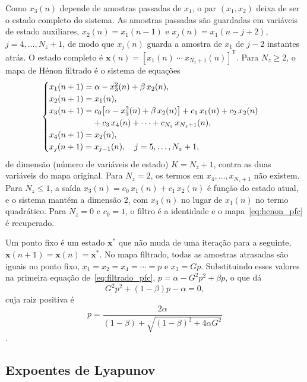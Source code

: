 \documentclass{pfccefsa}
\begin{document}
Como $x_3(n)$ depende de amostras passadas de $x_1$, o par $(x_1,x_2)$ deixa de
ser o estado completo do sistema. As amostras passadas são guardadas em
variáveis de estado auxiliares, $x_2(n)=x_1(n-1)$ e
$x_j(n)=x_1(n-j+2)$, $j=4,\ldots,N_z+1$, de modo que $x_j(n)$ guarda a
amostra de $x_1$ de $j-2$ instantes atrás. O estado completo é
$\mathbf{x}(n)=[x_1(n)\ \cdots\ x_{N_z+1}(n)]^{\mathsf T}$. Para $N_z\ge2$, o mapa de Hénon filtrado
é o sistema de equações \cite{Borges2022sbrt,BorgesCNSNS2024}
\begin{equation}
  \begin{cases}
    x_1(n+1) = \alpha - x_3^2(n) + \beta\,x_2(n),\\
    x_2(n+1) = x_1(n),\\
    x_3(n+1) = c_0\bigl[\alpha - x_3^2(n) + \beta\,x_2(n)\bigr]
      + c_1\,x_1(n) + c_2\,x_2(n)\\
    \hphantom{x_3(n+1) =} + c_3\,x_4(n) + \cdots + c_{N_z}\,x_{N_z+1}(n),\\
    x_4(n+1) = x_2(n),\\
    x_j(n+1) = x_{j-1}(n), \quad j=5,\ldots,N_z+1,
  \end{cases}
  \label{eq:filtrado_pfc}
\end{equation}
de dimensão (número de variáveis de estado) $K=N_z+1$, contra as duas variáveis
do mapa original. Para $N_z=2$, os termos em $x_4,\ldots,x_{N_z+1}$ não existem.
Para $N_z\le1$, a saída $x_3(n)=c_0\,x_1(n)+c_1\,x_2(n)$ é função do estado
atual, e o sistema mantém a dimensão 2, com $x_3(n)$ no lugar de $x_1(n)$ no
termo quadrático. Para $N_z=0$ e $c_0=1$, o filtro é a identidade e o
mapa~\eqref{eq:henon_pfc} é recuperado.

Um ponto fixo é um estado $\mathbf{x}^*$ que não muda de uma iteração para a
seguinte, $\mathbf{x}(n+1)=\mathbf{x}(n)=\mathbf{x}^*$. No mapa filtrado, todas
as amostras atrasadas são iguais no ponto fixo, $x_1=x_2=x_4=\cdots=p$ e
$x_3=Gp$. Substituindo esses valores na primeira equação
de~\eqref{eq:filtrado_pfc}, $p=\alpha-G^2p^2+\beta p$, o que dá
\begin{equation}
  G^2p^2+(1-\beta)p-\alpha=0,
  \label{eq:ponto_fixo_pfc}
\end{equation}
cuja raiz positiva é
\begin{equation}
  p=\frac{2\alpha}{(1-\beta)+\sqrt{(1-\beta)^2+4\alpha G^2}}
  \label{eq:ponto_fixo_raiz_pfc}
\end{equation}
\cite{BorgesCNSNS2024}.

\subsection{Expoentes de Lyapunov}
\label{sub:lyapunov}
\end{document}

